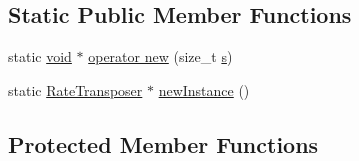 \subsection*{Static Public Member Functions}
\begin{DoxyCompactItemize}
\item 
static \hyperlink{sound_8c_ae35f5844602719cf66324f4de2a658b3}{void} $\ast$ \hyperlink{classsoundtouch_1_1_rate_transposer_a0c8f9f69a516db02cabb5058ca1a2920}{operator new} (size\+\_\+t \hyperlink{lib_2expat_8h_a755339d27872b13735c2cab829e47157}{s})
\item 
static \hyperlink{classsoundtouch_1_1_rate_transposer}{Rate\+Transposer} $\ast$ \hyperlink{classsoundtouch_1_1_rate_transposer_ae448f054ce6c765fc036ed632aa396e3}{new\+Instance} ()
\end{DoxyCompactItemize}
\subsection*{Protected Member Functions}
